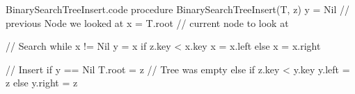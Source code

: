 \documentclass[a4paper]{article}
\begin{document}
\begin{filecontents*}[overwrite]{BinarySearchTreeInsert.code}
procedure BinarySearchTreeInsert(T, z)
    y = Nil  // previous Node we looked at
    x = T.root  // current node to look at
    
    // Search
    while x != Nil
        y = x
        if z.key < x.key
            x = x.left
        else
            x = x.right

    // Insert
    if y == Nil
        T.root = z  // Tree was empty
    else if z.key < y.key
        y.left = z
    else
        y.right = z
\end{filecontents*}

\end{document}
